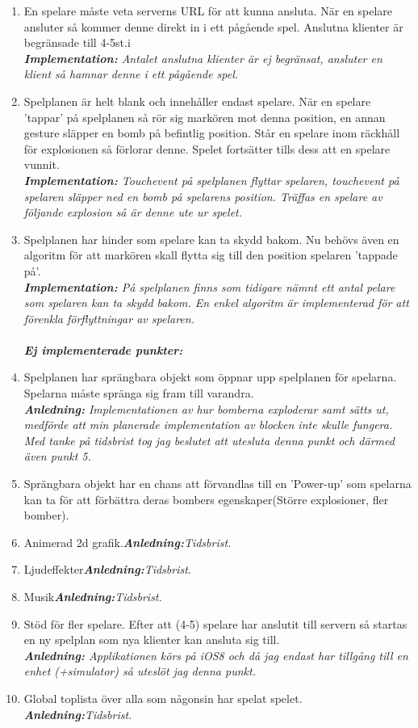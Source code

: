 \documentclass[10pt, titlepage, oneside, a4paper]{article}
\begin{document}
    	\begin{enumerate}
			\item En spelare måste veta serverns URL för att kunna ansluta. När en spelare ansluter så kommer denne direkt in i ett pågående spel. Anslutna klienter är begränsade till 4-5st.i\\\textit{\textbf{Implementation:} Antalet anslutna klienter är ej begränsat, ansluter en klient så hamnar denne i ett pågående spel.}
			
			\item Spelplanen är helt blank och innehåller endast spelare. När en spelare 'tappar' på spelplanen så rör sig markören mot denna position, en annan gesture släpper en bomb på befintlig position. Står en spelare inom räckhåll för explosionen så förlorar denne. Spelet fortsätter tills dess att en spelare vunnit.\\\textit{\textbf{Implementation:} Touchevent på spelplanen flyttar spelaren, touchevent på spelaren släpper ned en bomb på spelarens position. Träffas en spelare av följande explosion så är denne ute ur spelet.}
			
			
			\item Spelplanen har hinder som spelare kan ta skydd bakom. Nu behövs även en algoritm för att markören skall flytta sig till den position spelaren 'tappade på'.\\\textit{\textbf{Implementation:} På spelplanen finns som tidigare nämnt ett antal pelare som spelaren kan ta skydd bakom. En enkel algoritm är implementerad för att förenkla förflyttningar av spelaren.}
			\\\\\textit{\textbf{Ej implementerade punkter:}}
			\item Spelplanen har sprängbara objekt som öppnar upp spelplanen för spelarna. Spelarna måste spränga sig fram till varandra.\\\textit{\textbf{Anledning:} Implementationen av hur bomberna exploderar samt sätts ut, medförde att min planerade implementation av blocken inte skulle fungera. Med tanke på tidsbrist tog jag beslutet att utesluta denna punkt och därmed även punkt 5.}
			\item Sprängbara objekt har en chans att förvandlas till en 'Power-up' som spelarna kan ta för att förbättra deras bombers egenskaper(Större explosioner, fler bomber).
			\item Animerad 2d grafik.\textit{\textbf{Anledning:}Tidsbrist.}
			\item Ljudeffekter\textit{\textbf{Anledning:}Tidsbrist.}
			\item Musik\textit{\textbf{Anledning:}Tidsbrist.}
			\item Stöd för fler spelare. Efter att (4-5) spelare har anslutit till servern så startas en ny spelplan som nya klienter kan ansluta sig till.\\\textit{\textbf{Anledning:} Applikationen körs på iOS8 och då jag endast har tillgång till en enhet (+simulator) så uteslöt jag denna punkt.}
			\item Global toplista över alla som någonsin har spelat spelet.\\\textit{\textbf{Anledning:}Tidsbrist.}
		\end{enumerate}
		
\end{document}
